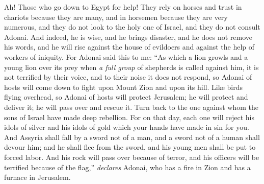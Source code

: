 \begin{biblechapter} %
 Ah! Those who go down to Egypt for help! They rely on horses
\verse and trust in chariots because they are many, 
and in horsemen because they are very numerous, 
and they do not look to the holy one of Israel, 
and they do not consult Adonai.
\verse And indeed, he is wise, and he brings disaster, 
and he does not remove his words, 
and he will rise against the house of evildoers 
and against the help of workers of iniquity.
\verse For Adonai said this to me: “As which a lion growls 
and a young lion over its prey when \textit{a full group} of shepherds is called against him, it is not terrified by their voice, 
and to their noise it does not respond, 
so Adonai of hosts will come down to fight upon Mount Zion 
and upon its hill.
\verse Like birds flying overhead, so Adonai of hosts will protect Jerusalem; he will protect and deliver it; 
he will pass over and rescue it.
\verse Turn back to the one against whom the sons of Israel have made deep rebellion.
\verse For on that day, each one will reject his idols of silver 
and his idols of gold which your hands have made in sin for you.
\verse And Assyria shall fall by a sword not of a man, 
and a sword not of a human shall devour him; 
and he shall flee from the sword, 
and his young men shall be put to forced labor.
\verse And his rock will pass over because of terror, 
and his officers will be terrified because of the flag,” 
\textit{declares} Adonai, 
who has a fire in Zion 
and has a furnace in Jerusalem.
\end{biblechapter}

